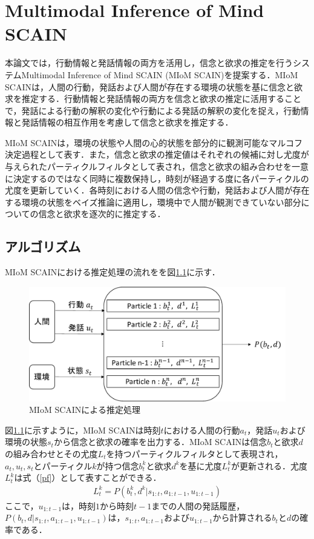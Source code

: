 \chapter{Multimodal Inference of Mind SCAIN}
\par
本論文では，行動情報と発話情報の両方を活用し，信念と欲求の推定を行うシステムMultimodal Inference of Mind SCAIN (MIoM SCAIN)を提案する．MIoM SCAINは，人間の行動，発話および人間が存在する環境の状態を基に信念と欲求を推定する．行動情報と発話情報の両方を信念と欲求の推定に活用することで，発話による行動の解釈の変化や行動による発話の解釈の変化を捉え，行動情報と発話情報の相互作用を考慮して信念と欲求を推定する．

\par
MIoM SCAINは，環境の状態や人間の心的状態を部分的に観測可能なマルコフ決定過程として表す．また，信念と欲求の推定値はそれぞれの候補に対し尤度が与えられたパーティクルフィルタとして表され，信念と欲求の組み合わせを一意に決定するのではなく同時に複数保持し，時刻が経過する度に各パーティクルの尤度を更新していく．各時刻における人間の信念や行動，発話および人間が存在する環境の状態をベイズ推論に適用し，環境中で人間が観測できていない部分についての信念と欲求を逐次的に推定する．


\section{アルゴリズム}

\par
MIoM SCAINにおける推定処理の流れをを図\ref{fig:sys_arc}に示す．
\begin{figure}[htbp]
  \begin{center}
    \includegraphics[scale=0.7]{./bt1.pdf}
    \caption{MIoM SCAINによる推定処理}
    \label{fig:sys_arc}
  \end{center}
\end{figure}
図\ref{fig:sys_arc}に示すように，MIoM SCAINは時刻$t$における人間の行動$a_t$，発話$u_t$および環境の状態$s_t$から信念と欲求の確率を出力する．MIoM SCAINは信念$b_t$と欲求$d$の組み合わせとその尤度$L_t$を持つパーティクルフィルタとして表現され，$a_t,u_t,s_t$とパーティクル$k$が持つ信念$b_t^k$と欲求$d^k$を基に尤度$L^k_t$が更新される．尤度$L^k_t$は式（\ref{pf}）として表すことができる．
\begin{equation}
  \begin{split}
  \label{pf}
  L^k_t=P(b_t^k,d^k|s_{1:t},a_{1:t-1},u_{1:t-1})
  \end{split}
\end{equation}
ここで，$u_{1:t-1}$は，時刻$1$から時刻$t-1$までの人間の発話履歴，$P(b_t,d|s_{1:t},a_{1:t-1},u_{1:t-1})$は，$s_{1:t},a_{1:t-1}およびu_{1:t-1}$から計算される$b_t$と$d$の確率である．

